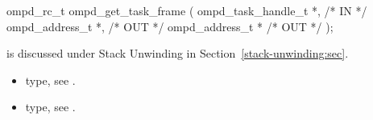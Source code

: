%
\summary

\format
\cspecificstart
\begin{boxedcode}
ompd\_rc\_t ompd\_get\_task\_frame (
  ompd\_task\_handle\_t        *,                           /* IN */
  ompd\_address\_t            *,                    /* OUT */
  ompd\_address\_t            *                  /* OUT */
);
\end{boxedcode}
\cspecificend

\descr
{} is discussed under Stack Unwinding in
Section~\ref{stack-unwinding:sec}.

\argdesc

\crossreferences
\begin{itemize}
	\item {} type, see .
	\item {} type, see .
\end{itemize}

%

